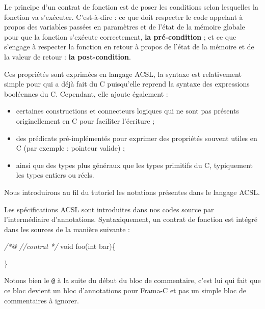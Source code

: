 \documentclass[12pt,francais,]{scrbook}
\newenvironment{Shaded}{}{}
\newcommand{\DataTypeTok}[1]{\textcolor[rgb]{0.56,0.13,0.00}{{#1}}}
\newcommand{\CommentTok}[1]{\textcolor[rgb]{0.38,0.63,0.69}{\textit{{#1}}}}
\newcommand{\NormalTok}[1]{{#1}}
\providecommand{\tightlist}{%
  \setlength{\itemsep}{0pt}\setlength{\parskip}{0pt}}
\begin{document}
Le principe d'un contrat de fonction est de poser les conditions selon
lesquelles la fonction va s'exécuter. C'est-à-dire : ce que doit
respecter le code appelant à propos des variables passées en paramètres
et de l'état de la mémoire globale pour que la fonction s'exécute
correctement, \textbf{la pré-condition} ; et ce que s'engage à respecter
la fonction en retour à propos de l'état de la mémoire et de la valeur
de retour : \textbf{la post-condition}.

Ces propriétés sont exprimées en langage ACSL, la syntaxe est
relativement simple pour qui a déjà fait du C puisqu'elle reprend la
syntaxe des expressions booléennes du C. Cependant, elle ajoute
également :

\begin{itemize}
\tightlist
\item
  certaines constructions et connecteurs logiques qui ne sont pas
  présents originellement en C pour faciliter l'écriture ;
\item
  des prédicats pré-implémentés pour exprimer des propriétés souvent
  utiles en C (par exemple : pointeur valide) ;
\item
  ainsi que des types plus généraux que les types primitifs du C,
  typiquement les types entiers ou réels.
\end{itemize}

Nous introduirons au fil du tutoriel les notations présentes dans le
langage ACSL.

Les spécifications ACSL sont introduites dans nos codes source par
l'intermédiaire d'annotations. Syntaxiquement, un contrat de fonction
est intégré dans les sources de la manière suivante :



\begin{footnotesize}\begin{Shaded}
\begin{Highlighting}[]
\CommentTok{/*@}
\CommentTok{  //contrat}
\CommentTok{*/}
\DataTypeTok{void} \NormalTok{foo(}\DataTypeTok{int} \NormalTok{bar)\{}

\NormalTok{\}}
\end{Highlighting}
\end{Shaded}\end{footnotesize}

Notons bien le \texttt{@} à la suite du début du bloc de commentaire,
c'est lui qui fait que ce bloc devient un bloc d'annotations pour
Frama-C et pas un simple bloc de commentaires à ignorer.
\end{document}
